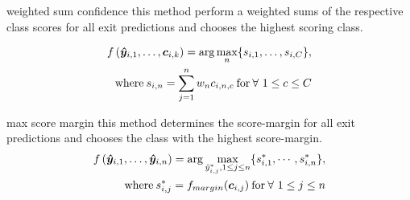 \begin{enumdescript}
\begin{enumdescript}
				\item[weighted sum confidence] this method perform a weighted sums of the respective class scores for all exit predictions and chooses the highest scoring class. 

				\begin{align}
				\begin{split}
					f\left(\bm{\hat{y}}_{i,1}, \dots, \bm{c}_{i,k} \right) = \arg \underset{n}{\max} \{s_{i,1}, \dots, s_{i,C}\},\\ \text{where\:} s_{i,n} = \sum_{j=1}^{n}w_n c_{i,n,c} \text{\:for\:} \forall \ 1\le c \le C
				\end{split}	
				\end{align}
				
				\item[max score margin] this method determines the score-margin for all exit predictions and chooses the class with the highest score-margin. 
				\begin{align}
				\begin{split}
				f\left(\bm{\hat{y}}_{i,1}, \dots, \bm{\hat{y}}_{i,n} \right) = \arg \underset{\hat{y}_{i,j}^{*}, 1 \le j 
						\le n}{\max} \{s^{*}_{i,1}, \cdots, s^{*}_{i,n}\},\\ \text{where\:} s^{*}_{i,j} = f_{margin}(\bm{c}_{i,j}) \text{\:for\:} \forall \ 1 \le j \le n
				\end{split}	
				\end{align}
		\end{enumdescript}
	\end{enumdescript}  




